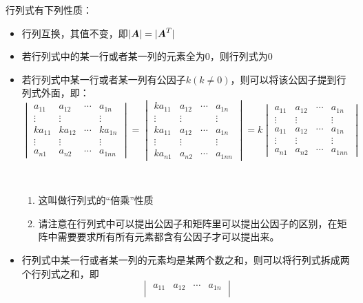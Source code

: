 \documentclass[12pt, a4paper, oneside, UTF8]{ctexbook}
\begin{document}
行列式有下列性质：
\begin{itemize}[leftmargin=4em]
    \item 行列互换，其值不变，即$|\boldsymbol{A}|=|\boldsymbol{A}^{T}|$
    \item 若行列式中的某一行或者某一列的元素全为$0$，则行列式为$0$
    \item 若行列式中某一行或者某一列有公因子$k(k\neq0)$，则可以将该公因子提到行列式外面，即：
    \[
    \begin{vmatrix}
        a_{11}&a_{12}&\cdots&a_{1n}\\
        \vdots&\vdots&&\vdots\\
        ka_{11}&ka_{12}&\cdots&ka_{1n}\\
        \vdots&\vdots&&\vdots\\
        a_{n1}&a_{n2}&\cdots&a_{1nn}
    \end{vmatrix}=
    \begin{vmatrix}
        ka_{11}&a_{12}&\cdots&a_{1n}\\
        \vdots&\vdots&&\vdots\\
        ka_{11}&a_{12}&\cdots&a_{1n}\\
        \vdots&\vdots&&\vdots\\
        ka_{n1}&a_{n2}&\cdots&a_{1nn}
    \end{vmatrix}=k
    \begin{vmatrix}
        a_{11}&a_{12}&\cdots&a_{1n}\\
        \vdots&\vdots&&\vdots\\
        a_{11}&a_{12}&\cdots&a_{1n}\\
        \vdots&\vdots&&\vdots\\
        a_{n1}&a_{n2}&\cdots&a_{1nn}
    \end{vmatrix}
    \]
    \begin{rmk}
        ~
        \begin{enumerate}
            \item 这叫做行列式的“倍乘”性质
            \item 请注意在行列式中可以提出公因子和矩阵里可以提出公因子的区别，在矩阵中需要要求所有所有元素都含有公因子才可以提出来。
        \end{enumerate}
    \end{rmk}
    \item 行列式中某一行或者某一列的元素均是某两个数之和，则可以将行列式拆成两个行列式之和，即
    \[\begin{vmatrix}
        a_{11} & a_{12} & \cdots & a_{1n}\\

\end{vmatrix}\]
\end{itemize}
\end{document}
